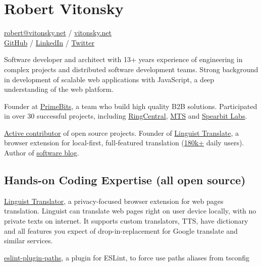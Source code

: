 \documentclass{vitonsky}
\begin{document}
\vitonskyPrintPhoto{}

\section*{\Large{Robert Vitonsky}}

\href{mailto:robert@vitonsky.net}{robert@vitonsky.net} / \href{https://vitonsky.net}{vitonsky.net}\\%
\href{https://github.com/vitonsky}{GitHub} /
\href{https://www.linkedin.com/in/vitonsky}{LinkedIn} /
\href{https://twitter.com/rvitonsky}{Twitter}

\vspace*{12pt}

Software developer and architect with 13+ years experience of engineering in complex projects and distributed software development teams. Strong background in development of scalable web applications with JavaScript, a deep understanding of the web platform.

Founder at \href{primebits.org}{PrimeBits}, a team who build high quality B2B solutions. Participated in over 30 successful projects, including \href{https://www.ringcentral.com/}{RingCentral}, \href{https://mts.rs/}{MTS} and \href{https://spearbit.com/}{Spearbit Labs}.

\href{https://github.com/vitonsky}{Active contributor} of open source projects. Founder of \href{https://linguister.io}{Linguist Translate}, a browser extension for local-first, full-featured translation (\href{https://chrome.google.com/webstore/detail/gbefmodhlophhakmoecijeppjblibmie}{180k+} daily users). Author of \href{https://vitonsky.net/}{software blog}.

\subsection*{Hands-on Coding Expertise (all open source)}

\href{https://github.com/translate-tools/linguist}{Linguist Translator}, a privacy-focused browser extension for web pages translation. Linguist can translate web pages right on user device locally, with no private texts on internet. It supports custom translators, TTS, have dictionary and all features you expect of drop-in-replacement for Google translate and similar services.

\href{https://github.com/vitonsky/eslint-plugin-paths}{eslint-plugin-paths}, a plugin for ESLint, to force use paths aliases from tsconfig
\end{document}
